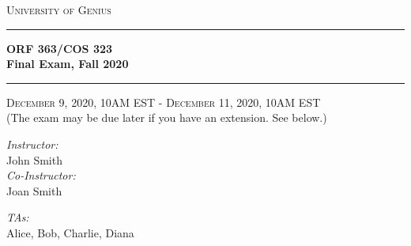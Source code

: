 \documentclass[12pt]{article}
\newcommand{\HRule}{\rule{\linewidth}{0.5mm}}
\begin{document}
\begin{titlepage}

\begin{center}

\textsc{\large University of Genius}

\bigskip

\HRule 
{ \Large \bfseries ORF 363/COS 323\\Final Exam, Fall 2020  }

\HRule 
\bigskip

\textsc{\large December 9, 2020, 10AM EST - December 11, 2020, 10AM EST}\\

\textrm{(The exam may be due later if you have an extension. See below.)}

\bigskip

\noindent
\begin{minipage}{0.4\textwidth}
\begin{flushleft} \large
\emph{Instructor:}\\
  John Smith \\
\emph{Co-Instructor:}\\
 Joan Smith
\end{flushleft}
\end{minipage}%
\begin{minipage}{0.4\textwidth}
\begin{flushright} \large
\emph{TAs:} \\
Alice, Bob, Charlie, Diana
\end{flushright}
\end{minipage}

\end{center}

\bigskip

\begin{center}
\end{center}
\bigskip 


\end{titlepage}
\end{document}
